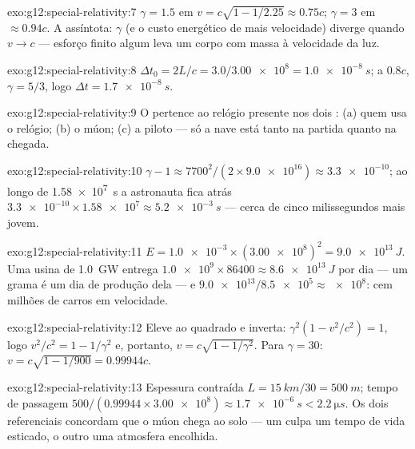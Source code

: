 \begin{solution}{exo:g12:special-relativity:7}
$\gamma = 1.5$ em $v = c\sqrt{1 - 1/2.25} \approx 0.75c$; $\gamma = 3$ em
$\approx 0.94c$. A assíntota: $\gamma$ (e o custo energético de mais
velocidade) diverge quando $v \to c$ --- esforço finito algum leva um
corpo com massa à velocidade da luz.
\end{solution}

\begin{solution}{exo:g12:special-relativity:8}
$\Delta t_0 = 2L/c = 3.0/\num{3.00e8} = \qty{1.0e-8}{s}$; a $0.8c$,
$\gamma = 5/3$, logo $\Delta t = \qty{1.7e-8}{s}$.
\end{solution}

\begin{solution}{exo:g12:special-relativity:9}
O  pertence ao relógio presente nos dois : (a) quem
usa o relógio; (b) o múon; (c) a piloto --- só a nave está tanto na
partida quanto na chegada.
\end{solution}

\begin{solution}{exo:g12:special-relativity:10}
$\gamma - 1 \approx 7700^2/(2 \times \num{9.0e16}) \approx \num{3.3e-10}$;
ao longo de \qty{1.58e7}{s} a astronauta fica atrás
$\num{3.3e-10} \times \num{1.58e7} \approx \qty{5.2e-3}{s}$ --- cerca de
cinco milissegundos mais jovem.
\end{solution}

\begin{solution}{exo:g12:special-relativity:11}
$E = \num{1.0e-3} \times (\num{3.00e8})^2 = \qty{9.0e13}{J}$. Uma usina de
\qty{1.0}{GW} entrega $\num{1.0e9} \times 86400 \approx \qty{8.6e13}{J}$
por dia --- um grama é um dia de produção dela --- e
$\num{9.0e13}/\num{8.5e5} \approx \num{e8}$: cem milhões de carros em
velocidade.
\end{solution}

\begin{solution}{exo:g12:special-relativity:12}
Eleve ao quadrado e inverta: $\gamma^2(1 - v^2/c^2) = 1$, logo
$v^2/c^2 = 1 - 1/\gamma^2$ e, portanto,
$v = c\sqrt{1 - 1/\gamma^2}$. Para $\gamma = 30$:
$v = c\sqrt{1 - 1/900} = 0.99944c$.
\end{solution}

\begin{solution}{exo:g12:special-relativity:13}
Espessura contraída $L = \qty{15}{km}/30 = \qty{500}{m}$; tempo de
passagem $500/(0.99944 \times \num{3.00e8}) \approx \qty{1.7e-6}{s} <
\qty{2.2}{\micro s}$. Os dois referenciais concordam que o múon chega ao
solo --- um culpa um tempo de vida esticado, o outro uma atmosfera
encolhida.
\end{solution}

